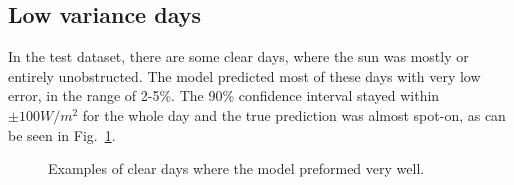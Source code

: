 \subsection{Low variance days}
In the test dataset, there are some clear days, where the sun was mostly or entirely unobstructed. The model predicted most of these days with very low error, in the range of 2-5\%. The 90\% confidence interval stayed within $\pm100 W/m^2$ for the whole day and the true prediction was almost spot-on, as can be seen in Fig.~\ref{fig:full_low_best}.
\begin{figure}[ht!]
    \centering
    \qquad
    \qquad
    \caption{Examples of clear days where the model preformed very well.
    \label{fig:full_low_best}}
\end{figure}


